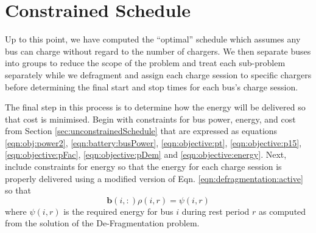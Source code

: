 \section{Constrained Schedule\label{sec:constrainedSchedule}}
Up to this point, we have computed the ``optimal'' schedule which assumes any bus can charge without regard to the number of chargers. We then separate buses into groups to reduce the scope of the problem and treat each sub-problem separately while we defragment and assign each charge session to specific chargers before determining the final start and stop times for each bus's charge session.
\par The final step in this process is to determine how the energy will be delivered so that cost is minimised. Begin with constraints for bus power, energy, and cost from Section \ref{sec:unconstrainedSchedule} that are expressed as equations \eqref{eqn:obj:power2}, \eqref{eqn:battery:busPower}, \eqref{eqn:objective:pt}, \eqref{eqn:objective:p15}, \eqref{eqn:objective:pFac}, \eqref{eqn:objective:pDem} and \eqref{eqn:objective:energy}. Next, include constraints for energy so that the energy for each charge session is properly delivered using a modified version of Eqn. \eqref{eqn:defragmentation:active} so that
\begin{equation}\label{eqn:constrainedSchedule:modified}
	\mathbf{b}(i,:)\rho(i,r) = \psi(i,r)
\end{equation}
where $\psi(i,r)$ is the required energy for bus $i$ during rest period $r$ as computed from the solution of the De-Fragmentation problem.
\\[0.1in] 
